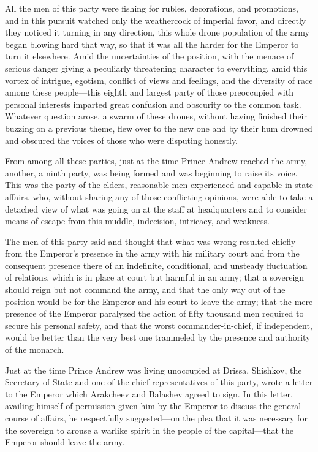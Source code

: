 All the men of this party were fishing for rubles, decorations,
and promotions, and in this pursuit watched only the weathercock
of imperial favor, and directly they noticed it turning in any
direction, this whole drone population of the army began blowing
hard that way, so that it was all the harder for the Emperor to
turn it elsewhere. Amid the uncertainties of the position, with
the menace of serious danger giving a peculiarly threatening
character to everything, amid this vortex of intrigue, egotism,
conflict of views and feelings, and the diversity of race among
these people---this eighth and largest party of those preoccupied
with personal interests imparted great confusion and obscurity to
the common task. Whatever question arose, a swarm of these
drones, without having finished their buzzing on a previous
theme, flew over to the new one and by their hum drowned and
obscured the voices of those who were disputing honestly.

From among all these parties, just at the time Prince Andrew
reached the army, another, a ninth party, was being formed and
was beginning to raise its voice. This was the party of the
elders, reasonable men experienced and capable in state affairs,
who, without sharing any of those conflicting opinions, were able
to take a detached view of what was going on at the staff at
headquarters and to consider means of escape from this muddle,
indecision, intricacy, and weakness.

The men of this party said and thought that what was wrong
resulted chiefly from the Emperor's presence in the army with his
military court and from the consequent presence there of an
indefinite, conditional, and unsteady fluctuation of relations,
which is in place at court but harmful in an army; that a
sovereign should reign but not command the army, and that the
only way out of the position would be for the Emperor and his
court to leave the army; that the mere presence of the Emperor
paralyzed the action of fifty thousand men required to secure his
personal safety, and that the worst commander-in-chief, if
independent, would be better than the very best one trammeled by
the presence and authority of the monarch.

Just at the time Prince Andrew was living unoccupied at Drissa,
Shishkov, the Secretary of State and one of the chief
representatives of this party, wrote a letter to the Emperor
which Arakcheev and Balashev agreed to sign. In this letter,
availing himself of permission given him by the Emperor to
discuss the general course of affairs, he respectfully
suggested---on the plea that it was necessary for the sovereign
to arouse a warlike spirit in the people of the capital---that
the Emperor should leave the army.

